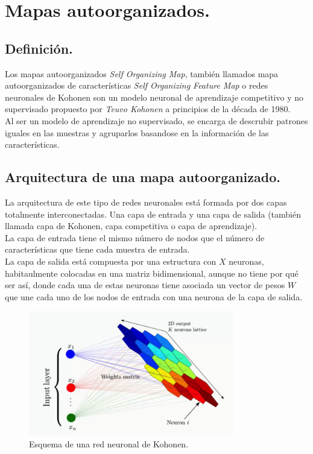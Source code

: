 \chapter{Mapas autoorganizados.}
\section{Definición.}
Los mapas autoorganizados \textit{Self Organizing Map}, también llamados mapa autoorganizados de características \textit{Self Organizing Feature Map} o redes neuronales de Kohonen son un modelo neuronal de aprendizaje competitivo y no supervisado propuesto por \textit{Teuvo Kohonen} a principios de la década de 1980.\\

Al ser un modelo de aprendizaje no supervisado, se encarga de descrubir patrones iguales en las muestras y agruparlos basandose en la información de las características. 

\section{Arquitectura de una mapa autoorganizado.}
La arquitectura de este tipo de redes neuronales está formada por dos capas totalmente interconectadas. Una capa de entrada y una capa de salida (también llamada capa de Kohonen, capa competitiva o capa de aprendizaje). \\

La capa de entrada tiene el mismo número de nodos que el número de características que tiene cada muestra de entrada.\\

La capa de salida está compuesta por una estructura con $X$ neuronas, habitaulmente colocadas en una matriz bidimensional, aunque no tiene por qué ser así, donde cada una de estas neuronas tiene asociada un vector de pesos $W$ que une cada uno de los nodos de entrada con una neurona de la capa de salida.
\begin{figure}
\centering
\includegraphics[width=0.8\textwidth]{imagenes/arquitectura_som.png}
\caption{Esquema de una red neuronal de Kohonen.}
\end{figure}
